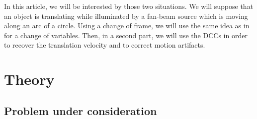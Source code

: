 \documentclass[twocolumn]{IEEEtran}
\numberwithin{equation}{section}
\begin{document}
In this article, we will be interested by those two situations. We will suppose that an object is translating while illuminated by a fan-beam source which is moving along an arc of a circle. Using a change of frame, we will use the same idea as in~\cite{clackdoyle2015consistency} for a change of variables. Then, in a second part, we will use the DCCs in order to recover the translation velocity and to correct motion artifacts.

\section{Theory} 
\label{sec:theory}

\subsection{Problem under consideration}
\label{sub:problem_under_consideration}
\end{document}
